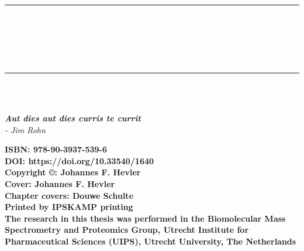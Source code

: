 \cleardoublepage
\pagestyle{empty} %
\frontmatter %

\begin{titlepage}
    \begin{center}
        \rule{\textwidth}{1.5pt}\\[0cm]
        {\huge \bfseries \thesistitle \par \ }\\[-0.5cm]
        \rule{\textwidth}{1.5pt}\\[2.5cm]
        {\large \bfseries\name}\\
        [2cm]
        \begin{small}
            \emph{\textbf{Aut dies aut dies curris te currit} \\
                - Jim Rohn}
        \end{small}
    \end{center}
    \clearpage
    \begin{flushleft}
        \vspace*{\fill}

        {\small \textbf{ISBN: 978-90-3937-539-6}\\
        \textbf{DOI: https://doi.org/10.33540/1640}\\
        [0.5cm]
        \textbf{Copyright ©: Johannes F. Hevler}\\
        \textbf{Cover: Johannes F. Hevler}\\
        \textbf{Chapter covers: Douwe Schulte}\\
        \textbf{Printed by IPSKAMP printing}\\
        [0.5cm]
        \textbf{The research in this thesis was performed in the Biomolecular Mass
            Spectrometry and Proteomics Group, Utrecht Institute for Pharmaceutical Sciences (UIPS), Utrecht University, The Netherlands}}

    \end{flushleft}
    \clearpage


\end{titlepage}
